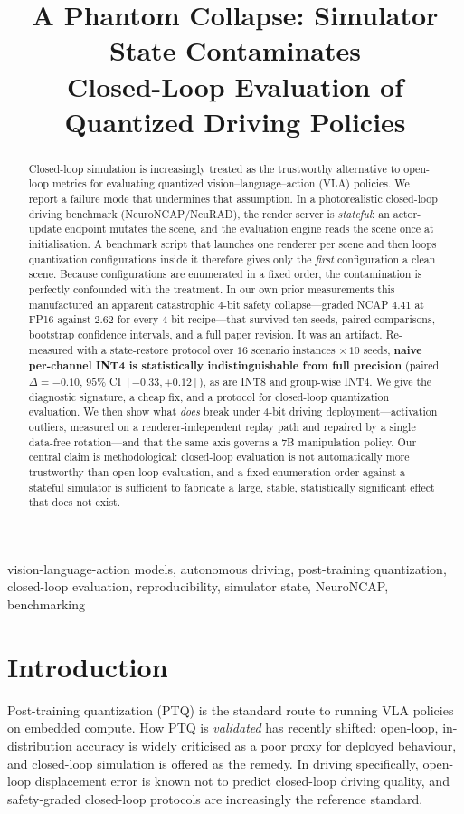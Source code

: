 \documentclass[conference]{IEEEtran}
\title{\textbf{A Phantom Collapse: Simulator State Contaminates\\
Closed-Loop Evaluation of Quantized Driving Policies}}
\author{\IEEEauthorblockN{Anonymous Submission}
\IEEEauthorblockA{Paper ID: XXXX}}
\begin{document}
\maketitle


\begin{abstract}
Closed-loop simulation is increasingly treated as the trustworthy alternative to open-loop
metrics for evaluating quantized vision--language--action (VLA) policies. We report a failure mode
that undermines that assumption. In a photorealistic closed-loop driving benchmark
(NeuroNCAP/NeuRAD), the render server is \emph{stateful}: an actor-update endpoint mutates the
scene, and the evaluation engine reads the scene once at initialisation. A benchmark script that
launches one renderer per scene and then loops quantization configurations inside it therefore
gives only the \emph{first} configuration a clean scene. Because configurations are enumerated in
a fixed order, the contamination is perfectly confounded with the treatment. In our own prior
measurements this manufactured an apparent catastrophic 4-bit safety collapse---graded NCAP
$4.41$ at FP16 against $2.62$ for every 4-bit recipe---that survived ten seeds, paired
comparisons, bootstrap confidence intervals, and a full paper revision. It was an artifact.
Re-measured with a state-restore protocol over $16$ scenario instances $\times\,10$ seeds,
\textbf{naive per-channel INT4 is statistically indistinguishable from full precision}
(paired $\Delta=-0.10$, $95\%$ CI $[-0.33,+0.12]$), as are INT8 and group-wise INT4. We give the
diagnostic signature, a cheap fix, and a protocol for closed-loop quantization evaluation. We then
show what \emph{does} break under 4-bit driving deployment---activation outliers, measured on a
renderer-independent replay path and repaired by a single data-free rotation---and that the same
axis governs a 7B manipulation policy. Our central claim is methodological: closed-loop evaluation
is not automatically more trustworthy than open-loop evaluation, and a fixed enumeration order
against a stateful simulator is sufficient to fabricate a large, stable, statistically significant
effect that does not exist.
\end{abstract}
\begin{IEEEkeywords}
vision-language-action models, autonomous driving, post-training quantization, closed-loop
evaluation, reproducibility, simulator state, NeuroNCAP, benchmarking
\end{IEEEkeywords}

\section{Introduction}
Post-training quantization (PTQ) is the standard route to running VLA policies on embedded
compute. How PTQ is \emph{validated} has recently shifted: open-loop, in-distribution accuracy is
widely criticised as a poor proxy for deployed behaviour, and closed-loop simulation is offered as
the remedy. In driving specifically, open-loop displacement error is known not to predict
closed-loop driving quality, and safety-graded closed-loop protocols are increasingly the
reference standard.
\end{document}
